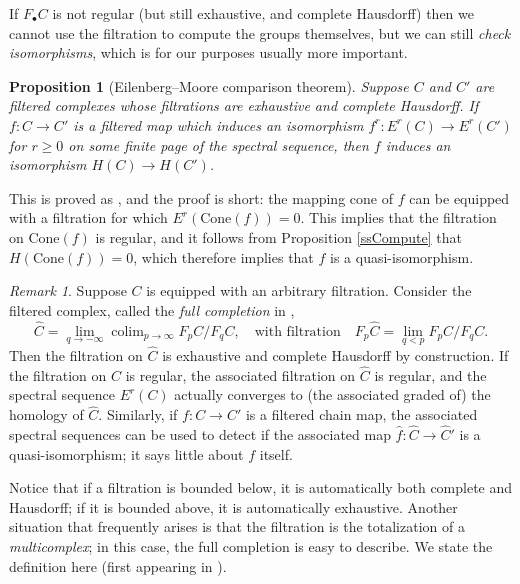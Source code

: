 \documentclass{memo-l}
\DeclareMathOperator{\colim}{colim}
\newtheorem{proposition}[theorem]{Proposition}
\theoremstyle{definition}
\theoremstyle{remark}
\newtheorem{remark}[theorem]{Remark}
\numberwithin{section}{chapter}
\numberwithin{equation}{chapter}
\begin{document}
If $F_\bullet C$ is not regular (but still exhaustive, and complete Hausdorff) then we cannot use the filtration to compute the groups themselves, but we can still \emph{check isomorphisms}, which is for our purposes usually more important. 

\begin{proposition}[Eilenberg--Moore comparison theorem]\label{ssComparison}
Suppose $C$ and $C'$ are filtered complexes whose filtrations are exhaustive and complete Hausdorff. If $f: C \to C'$ is a filtered map which induces an isomorphism $f^r: E^r(C) \to E^r(C')$ for $r \ge 0$ on some finite page of the spectral sequence, then $f$ induces an isomorphism $H(C) \to H(C')$. 
\end{proposition}

This is proved as \cite[Theorem 5.5.11]{weibel1995introduction}, and the proof is short: the mapping cone of $f$ can be equipped with a filtration for which $E^r(\text{Cone}(f)) = 0$. This implies that the filtration on $\text{Cone}(f)$ is regular, and it follows from Proposition \ref{ssCompute} that $H(\text{Cone}(f)) = 0$, which therefore implies that $f$ is a quasi-isomorphism.

\begin{remark}\label{rmk:completion}
Suppose $C$ is equipped with an arbitrary filtration. Consider the filtered complex, called the \emph{full completion} in \cite{GOH}, $$\hat C = \lim_{q \to -\infty} \colim_{p \to \infty} F_p C/F_q C,\quad  \text{with filtration} \quad F_p \hat C = \lim_{q < p} F_p C/F_q C.$$ Then the filtration on $\hat C$ is exhaustive and complete Hausdorff by construction. If the filtration on $C$ is regular, the associated filtration on $\hat C$ is regular, and the spectral sequence $E^r(C)$ actually converges to (the associated graded of) the homology of $\hat C$. Similarly, if $f: C \to C'$ is a filtered chain map, the associated spectral sequences can be used to detect if the associated map $\hat f: \hat C \to \hat C'$ is a quasi-isomorphism; it says little about $f$ itself.
\end{remark}

Notice that if a filtration is bounded below, it is automatically both complete and Hausdorff; if it is bounded above, it is automatically exhaustive. Another situation that frequently arises is that the filtration is the totalization of a \textit{multicomplex}; in this case, the full completion is easy to describe. We state the definition here (first appearing in \cite{wall_1961}).
\end{document}
